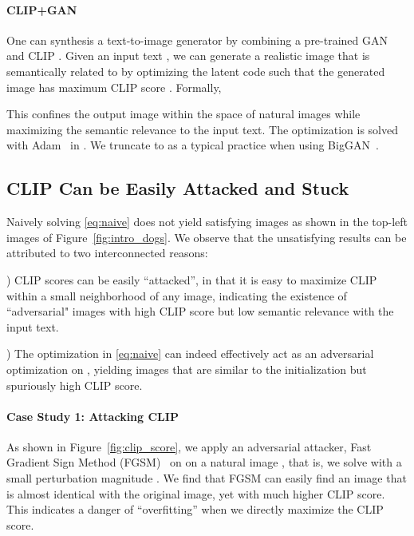 \documentclass[10pt,twocolumn,letterpaper]{article}
\newcommand{\ganclip}{CLIP+GAN}
\begin{document}
\paragraph{\ganclip}
One can synthesis a text-to-image generator by 
combining a pre-trained GAN  and CLIP . 
Given an input text , 
we can generate a realistic image  that is semantically related to  by optimizing the latent code  such that the generated image  has maximum CLIP score . Formally, 

This confines the output image within the space of natural images 
while maximizing the semantic relevance to the input text. 
The optimization is 
solved with Adam~\cite{kingma2015adam} in \cite{zhu2016generative, bigsleep}. We truncate  to  as a typical practice when using BigGAN~\cite{brock2018large, huh2020transforming}. 


\subsection{CLIP Can be Easily Attacked and Stuck}  Naively solving \eqref{eq:naive} does not yield 
satisfying images
as shown in the top-left images of Figure~\ref{fig:intro_dogs}. 
We observe that the unsatisfying results  
can be attributed to two interconnected reasons:  


) CLIP scores can be easily ``attacked'', 
in that it is easy to maximize 
 CLIP  
within a small neighborhood 
of any image, indicating the existence of ``adversarial" 
images with high CLIP score but low semantic relevance with the input text. 

) The optimization in \eqref{eq:naive} can indeed effectively act as 
an adversarial optimization 
on , yielding images that are similar to the initialization but spuriously high CLIP score. 

\paragraph{Case Study 1: Attacking CLIP} 
As shown in Figure~\ref{fig:clip_score}, 
we apply an adversarial  attacker, 
Fast Gradient Sign Method (FGSM)~\cite{goodfellow2014explaining} on  
on a natural image , that is, we solve    with a small perturbation magnitude . 
We find that  FGSM can easily find an image that is almost identical with the original image, 
yet with much higher CLIP score. 
This indicates a danger of ``overfitting'' when we directly maximize the CLIP score. 
\end{document}
